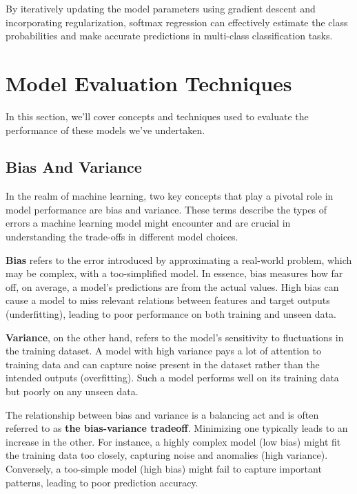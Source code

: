 \documentclass[letterpaper,10pt]{article}
\begin{document}
By iteratively updating the model parameters using gradient descent and incorporating regularization, softmax regression can effectively estimate the class probabilities and make accurate predictions in multi-class classification tasks.

\newpage


\section{Model Evaluation Techniques}
In this section, we'll cover concepts and techniques used to evaluate the performance of these models we've undertaken.
\subsection{Bias And Variance}
In the realm of machine learning, two key concepts that play a pivotal role in model performance are bias and variance. These terms describe the types of errors a machine learning model might encounter and are crucial in understanding the trade-offs in different model choices. \par

\textbf{Bias} refers to the error introduced by approximating a real-world problem, which may be complex, with a too-simplified model. In essence, bias measures how far off, on average, a model's predictions are from the actual values. High bias can cause a model to miss relevant relations between features and target outputs (underfitting), leading to poor performance on both training and unseen data. \par

\textbf{Variance}, on the other hand, refers to the model's sensitivity to fluctuations in the training dataset. A model with high variance pays a lot of attention to training data and can capture noise present in the dataset rather than the intended outputs (overfitting). Such a model performs well on its training data but poorly on any unseen data. \par

The relationship between bias and variance is a balancing act and is often referred to as \textbf{the bias-variance tradeoff}. Minimizing one typically leads to an increase in the other. For instance, a highly complex model (low bias) might fit the training data too closely, capturing noise and anomalies (high variance). Conversely, a too-simple model (high bias) might fail to capture important patterns, leading to poor prediction accuracy. \par
\end{document}
